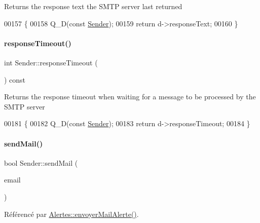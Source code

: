 Returns the response text the S\+M\+TP server last returned 
\begin{DoxyCode}
00157 \{
00158     Q\_D(\textcolor{keyword}{const} \hyperlink{class_simple_mail_1_1_sender}{Sender});
00159     \textcolor{keywordflow}{return} d->responseText;
00160 \}
\end{DoxyCode}
\mbox{\label{class_simple_mail_1_1_sender_a8a1e00cc48a9ac1106460f4bd856781d}} 
\paragraph{\texorpdfstring{response\+Timeout()}{responseTimeout()}}
{\footnotesize\ttfamily int Sender\+::response\+Timeout (\begin{DoxyParamCaption}{ }\end{DoxyParamCaption}) const}

Returns the response timeout when waiting for a message to be processed by the S\+M\+TP server 
\begin{DoxyCode}
00181 \{
00182     Q\_D(\textcolor{keyword}{const} \hyperlink{class_simple_mail_1_1_sender}{Sender});
00183     \textcolor{keywordflow}{return} d->responseTimeout;
00184 \}
\end{DoxyCode}
\mbox{\label{class_simple_mail_1_1_sender_a808b076c07f6e97e28fca75d0a069260}} 
\paragraph{\texorpdfstring{send\+Mail()}{sendMail()}}
{\footnotesize\ttfamily bool Sender\+::send\+Mail (\begin{DoxyParamCaption}\item[{\hyperlink{class_simple_mail_1_1_mime_message}{Mime\+Message} \&}]{email }\end{DoxyParamCaption})}



Référencé par \hyperlink{class_alertes_a375783502a78109f3323dc1ed90cfdc9}{Alertes\+::envoyer\+Mail\+Alerte()}.


